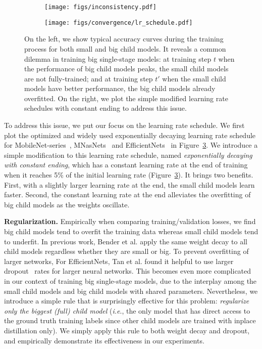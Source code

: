 \documentclass[runningheads]{llncs}
\def\onedot{.}
\def\ie{\emph{i.e}\onedot} \def\Ie{\emph{I.e}\onedot}
\begin{document}
\begin{figure}[ht]
    \centering
    \begin{subfigure}[b]{0.48\textwidth}
        \centering
        \texttt{[image: figs/inconsistency.pdf]}
        \caption{}
        \label{figs:convergence_a}
    \end{subfigure}
    \begin{subfigure}[b]{0.48\textwidth}
        \texttt{[image: figs/convergence/lr\_schedule.pdf]}
        \caption{}
        \label{figs:convergence_b}
    \end{subfigure}
\caption{On the left, we show typical accuracy curves during the training process for both small and big child models. It reveals a common dilemma in training big single-stage models: at training step \(t\) when the performance of big child models peaks, the small child models are not fully-trained; and at training step \(t'\) when the small child models have better performance, the big child models already overfitted. On the right, we plot the simple modified learning rate schedules with constant ending to address this issue.
}
\end{figure}

To address this issue, we put our focus on the learning rate schedule. We first plot the optimized and widely used exponentially decaying learning rate schedule for MobileNet-series~\cite{howard2017mobilenets, sandler2018inverted, howard2019searching}, MNasNets~\cite{tan2018mnasnet} and EfficientNets~\cite{tan2019efficientnet} in Figure~\ref{figs:convergence_b}. We introduce a simple modification to this learning rate schedule, named \textit{exponentially decaying with constant ending}, which has a constant learning rate at the end of training when it reaches 5\% of the initial learning rate (Figure~\ref{figs:convergence_b}). It brings two benefits. First, with a slightly larger learning rate at the end, the small child models learn faster. Second, the constant learning rate at the end alleviates the overfitting of big child models as the weights oscillate.

\textbf{Regularization.} Empirically when comparing training/validation losses, we find big child models tend to overfit the training data whereas small child models tend to underfit. In previous work, Bender et al. \cite{bender2018understanding} apply the same weight decay to all child models regardless whether they are small or big. To prevent overfitting of larger networks, For EfficientNets, Tan et al. \cite{tan2019efficientnet} found it helpful to use larger dropout~\cite{srivastava2014dropout} rates for larger neural networks.
This becomes even more complicated in our context of training big single-stage models, due to the interplay among the small child models and big child models with shared parameters. Nevertheless, we introduce a simple rule that is surprisingly effective for this problem: \textit{regularize only the biggest (full) child model} (\ie, the only model that has direct access to the ground truth training labels since other child models are trained with inplace distillation only). We simply apply this rule to both weight decay and dropout, and empirically demonstrate its effectiveness in our experiments.
\end{document}
